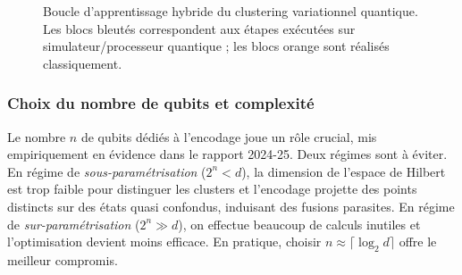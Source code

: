 \documentclass[a4paper]{article}
\begin{document}
\begin{figure}[H]
\centering
{}
\caption{Boucle d'apprentissage hybride du clustering variationnel quantique. Les blocs bleutés correspondent aux étapes exécutées sur simulateur/processeur quantique ; les blocs orange sont réalisés classiquement.}
\label{fig:vqc-loop}
\end{figure}

\subsubsection*{Choix du nombre de qubits et complexité}

Le nombre $n$ de qubits dédiés à l'encodage joue un rôle crucial, mis empiriquement en évidence dans le rapport 2024-25. Deux régimes sont à éviter. En régime de \emph{sous-paramétrisation} ($2^n < d$), la dimension de l'espace de Hilbert est trop faible pour distinguer les clusters et l'encodage projette des points distincts sur des états quasi confondus, induisant des fusions parasites. En régime de \emph{sur-paramétrisation} ($2^n \gg d$), on effectue beaucoup de calculs inutiles et l'optimisation devient moins efficace. En pratique, choisir $n \approx \lceil\log_2 d\rceil$ offre le meilleur compromis.
\end{document}
